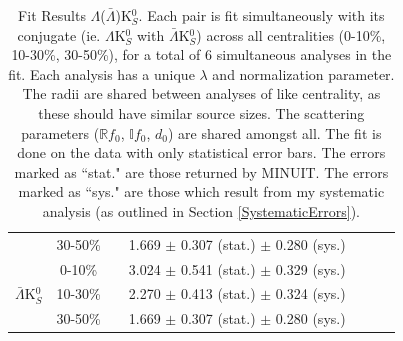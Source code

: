 \documentclass[../AnalysisNoteJBuxton.tex]{subfiles}
\begin{document}
\begin{landscape}
\begin{table}[htbp]
{\begin{tabular}{|c|c|c|c|c|c|c|}
   & 30-50\% & 
             & 1.669 $\pm$ 0.307 (stat.) $\pm$ 0.280 (sys.)  %
             & & & \\
  \cline{1-2}
  \cline{4-4}
  \multirow{3}{*}{$\bar{\Lambda}$K$^{0}_{S}$}  
   &  0-10\% & 
             & 3.024 $\pm$ 0.541 (stat.) $\pm$ 0.329 (sys.)  %
             & & & \\
             
   & 10-30\% & 
             & 2.270 $\pm$ 0.413 (stat.) $\pm$ 0.324 (sys.)  %
             & & & \\
             
   & 30-50\% & 
             & 1.669 $\pm$ 0.307 (stat.) $\pm$ 0.280 (sys.)  %
             & & & \\
  \hline
 \end{tabular}}
 \caption{Fit Results $\Lambda$($\bar{\Lambda}$)K$^{0}_{S}$. 
 Each pair is fit simultaneously with its conjugate (ie. $\Lambda$K$^{0}_{S}$ with $\bar{\Lambda}$K$^{0}_{S}$) across all centralities (0-10\%, 10-30\%, 30-50\%), for a total of 6 simultaneous analyses in the fit.
 Each analysis has a unique $\lambda$ and normalization parameter.
 The radii are shared between analyses of like centrality, as these should have similar source sizes.
 The scattering parameters ($\mathbb{R}f_{0}$, $\mathbb{I}f_{0}$, $d_{0}$) are shared amongst all.
 The fit is done on the data with only statistical error bars.
 The errors marked as ``stat." are those returned by MINUIT.
 The errors marked as ``sys." are those which result from my systematic analysis (as outlined in Section \ref{SystematicErrors}).}
 \label{tab:FitResultsLamK0}
\end{table}





\begin{table}[htbp]
 \centering
\end{table}
\end{landscape}
\end{document}

